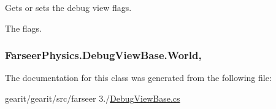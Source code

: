 Gets or sets the debug view flags. 

The flags.\hypertarget{class_farseer_physics_1_1_debug_view_base_a79c754ec56ede4e41b5faad2288652fe}{
\subsubsection[{World}]{ Farseer\+Physics.\+Debug\+View\+Base.\+World\hspace{0.3cm}{\ttfamily [get]}, {\ttfamily [protected]}}}\label{class_farseer_physics_1_1_debug_view_base_a79c754ec56ede4e41b5faad2288652fe}


The documentation for this class was generated from the following file\+:\begin{DoxyCompactItemize}
\item 
gearit/gearit/src/farseer 3./\hyperlink{_debug_view_base_8cs}{Debug\+View\+Base.\+cs}\end{DoxyCompactItemize}
